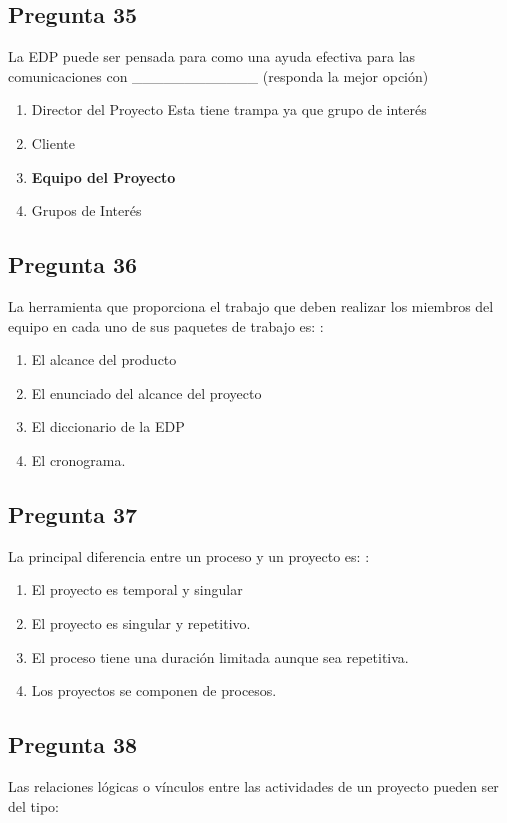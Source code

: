 \documentclass[11pt,a4paper]{article}
\begin{document}
\subsection*{Pregunta 35}
La EDP puede ser pensada para como una ayuda efectiva para las comunicaciones con \_\_\_\_\_\_\_\_\_\_\_\_ (responda la mejor opción)

\begin{enumerate}[label=\alph*)]
  \item Director del Proyecto Esta tiene trampa ya que grupo de interés
  \item Cliente
  \item \textbf{Equipo del Proyecto}
  \item Grupos de Interés
\end{enumerate}

\subsection*{Pregunta 36}
La herramienta que proporciona el trabajo que deben realizar los miembros del equipo en cada uno de sus paquetes de trabajo es: :

\begin{enumerate}[label=\alph*)]
  \item El alcance del producto
  \item El enunciado del alcance del proyecto
  \item El diccionario de la EDP
  \item El cronograma.
\end{enumerate}

\subsection*{Pregunta 37}
La principal diferencia entre un proceso y un proyecto es: :

\begin{enumerate}[label=\alph*)]
  \item El proyecto es temporal y singular
  \item El proyecto es singular y repetitivo.
  \item El proceso tiene una duración limitada aunque sea repetitiva.
  \item Los proyectos se componen de procesos.
\end{enumerate}

\subsection*{Pregunta 38}
Las relaciones lógicas o vínculos entre las actividades de un proyecto pueden ser del tipo:
\end{document}
